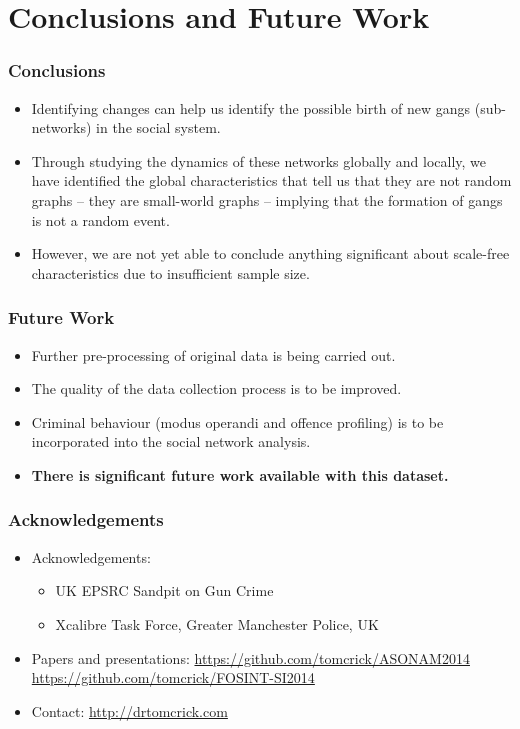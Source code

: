 \documentclass[pdftex]{beamer}
\begin{document}
\section{Conclusions and Future Work}

\begin{frame}
\frametitle{Conclusions}
\begin{itemize}
\item Identifying changes can help us identify the possible birth of
  new gangs (sub-networks) in the social system.
\item Through studying the dynamics of these networks globally and
  locally, we have identified the global characteristics that tell us
  that they are not random graphs -- they are small-world graphs -- 
  implying that the formation of gangs is not a random event. 
\item However, we are not yet able to conclude anything significant
  about scale-free characteristics due to insufficient sample size.
\end{itemize}
\end{frame}

\begin{frame}
\frametitle{Future Work}
\begin{itemize}
\item Further pre-processing of original data is being carried out.
\item The quality of the data collection process is to be improved.
\item Criminal behaviour (modus operandi and offence profiling) is to
be incorporated into the social network analysis.
\pause
\item {\textbf{There is significant future work available with this dataset.}}
\end{itemize}
\end{frame}

\begin{frame}
\frametitle{Acknowledgements}
\begin{itemize}
\item Acknowledgements:
\begin{itemize}
\item UK EPSRC Sandpit on Gun Crime
\item Xcalibre Task Force, Greater Manchester Police, UK\newline
\end{itemize}
\item Papers and presentations:
  \url{https://github.com/tomcrick/ASONAM2014}\\
\url{https://github.com/tomcrick/FOSINT-SI2014}\newline
\item Contact: \url{http://drtomcrick.com}
\end{itemize}
\end{frame}
\end{document}
